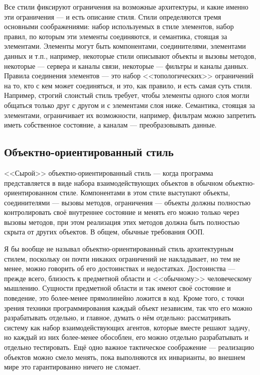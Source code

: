 \documentclass[a5paper]{article}
\begin{document}
Все стили фиксируют ограничения на возможные архитектуры, и какие именно эти ограничения --- и есть описание стиля. Стили определяются тремя основными соображениями: набор используемых в стиле элементов, набор правил, по которым эти элементы соединяются, и семантика, стоящая за элементами. Элементы могут быть компонентами, соединителями, элементами данных и т.п., например, некоторые стили описывают объекты и вызовы методов, некоторые --- сервера и каналы связи, некоторые --- фильтры и каналы данных. Правила соединения элементов --- это набор <<топологических>> ограничений на то, кто с кем может соединяться, и это, как правило, и есть самая суть стиля. Например, строгий слоистый стиль требует, чтобы элементы одного слоя могли общаться только друг с другом и с элементами слоя ниже. Семантика, стоящая за элементами, ограничивает их возможности, например, фильтрам можно запретить иметь собственное состояние, а каналам --- преобразовывать данные.

\subsection{Объектно-ориентированный стиль}

<<Сырой>> объектно-ориентированный стиль --- когда программа представляется в виде набора взаимодействующих объектов в обычном объектно-ориентированном стиле. Компонентами в этом стиле выступают объекты, соединителями --- вызовы методов, ограничения --- объекты должны полностью контролировать своё внутреннее состояние и менять его можно только через вызовы методов, при этом реализация этих методов должна быть полностью скрыта от других объектов. В общем, обычные требования ООП.

Я бы вообще не называл объектно-ориентированный стиль архитектурным стилем, поскольку он почти никаких ограничений не накладывает, но тем не менее, можно говорить об его достоинствах и недостатках. Достоинства --- прежде всего, близость к предметной области и <<обычному>> человеческому мышлению. Сущности предметной области и так имеют своё состояние и поведение, это более-менее прямолинейно ложится в код. Кроме того, с точки зрения техники программирования каждый объект независим, так что его можно разрабатывать отдельно, и главное, думать о нём отдельно: рассматривать систему как набор взаимодействующих агентов, которые вместе решают задачу, но каждый из них более-менее обособлен, его можно отдельно разрабатывать и отдельно тестировать. Ещё одно важное тактическое соображение --- реализацию объектов можно смело менять, пока выполняются их инварианты, во внешнем мире это гарантированно ничего не сломает.
\end{document}

